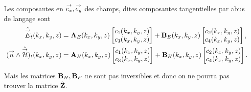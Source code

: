   Les composantes en \({\overset{\rightarrow}{e_x}},{\overset{\rightarrow}{e_y}}\) des champs, dites composantes tangentielles par abus de langage sont
  \begin{align*}
      \hat{{\overset{\rightarrow}{E}}}_t(k_x,k_y,z) &= \mathbf{A}_E(k_x,k_y,z) \begin{bmatrix}c_1(k_x,k_y,z) \\ c_3(k_x,k_y,z)\end{bmatrix} + \mathbf{B}_E(k_x,k_y,z) \begin{bmatrix}c_2(k_x,k_y,z) \\ c_4(k_x,k_y,z)\end{bmatrix},
      \\
      ({\overset{\rightarrow}{n}} \wedge \hat{{\overset{\rightarrow}{\mathcal{H}}}})_t(k_x,k_y,z) &= \mathbf{A}_H(k_x,k_y,z) \begin{bmatrix}c_1(k_x,k_y,z) \\ c_3(k_x,k_y,z)\end{bmatrix} + \mathbf{B}_H(k_x,k_y,z) \begin{bmatrix}c_2(k_x,k_y,z) \\ c_4(k_x,k_y,z)\end{bmatrix}.
  \end{align*}

  Mais les matrices \(\mathbf{B}_{H}, \mathbf{B}_E\) ne sont pas inversibles et donc on ne pourra pas trouver la matrice \(\hat{\mathbf{Z}}\).

